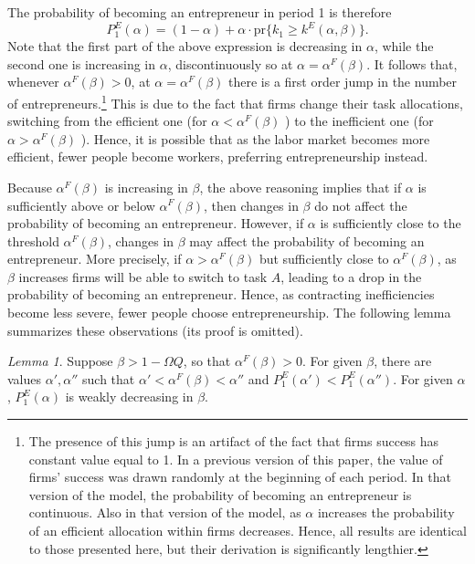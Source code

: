 \documentclass[12pt,american]{paper}
\theoremstyle{remark}
\newtheorem{lemma}{Lemma}
\begin{document}
 The probability of becoming an entrepreneur in period 1 is therefore
 \[
 P^E_1(\alpha) = (1-\alpha) + \alpha \cdot \mbox{pr}\{k_1 \geq k^E (\alpha,\beta) \}.
 \]
 Note that the first part of the above expression is decreasing in $\alpha$, while the second one is increasing in $\alpha$, discontinuously so at $\alpha=\alpha^F(\beta)$. It follows that, whenever $\alpha^F(\beta) > 0$, at $\alpha=\alpha^F(\beta)$ there is a first order jump in the number of entrepreneurs.\footnote{The presence of this jump is an artifact of the fact that firms success has constant value equal to 1. In a previous version of this paper, the value of firms' success was drawn randomly at the beginning of each period. In that version of the model, the probability of becoming an entrepreneur is continuous. Also in that version of the model, as $\alpha$ increases the probability of an efficient allocation within firms decreases. Hence, all results are identical to those presented here, but their derivation is significantly lengthier. }   This is due to the fact that firms change their task allocations, switching from the efficient one (for $\alpha<\alpha^F(\beta)$ ) to the inefficient one (for $\alpha>\alpha^F(\beta)$ ). Hence, it is possible that as the labor market becomes more efficient, fewer people become workers, preferring entrepreneurship instead. 
 
Because $\alpha^F(\beta)$ is increasing in $\beta$, the above reasoning implies that if $\alpha$ is sufficiently above or below $\alpha^F(\beta)$, then changes in $\beta$ do not affect the probability of becoming an entrepreneur. However, if $\alpha$ is sufficiently close to the threshold $\alpha^F(\beta)$, changes in $\beta$ may affect the probability of becoming an entrepreneur. More precisely, if $\alpha>\alpha^F(\beta)$ but sufficiently close to $\alpha^F(\beta)$, as $\beta$ increases firms will be able to switch to task $A$, leading to a drop in the probability of becoming an entrepreneur. Hence, as contracting inefficiencies become less severe, fewer people choose entrepreneurship. The following lemma summarizes these observations (its proof is omitted).
\begin{lemma}\label{lem: p1}
Suppose $\beta>1-\Omega Q$, so that $\alpha^F(\beta) > 0$. For given $\beta$, there are values $\alpha',\alpha''$ such that $\alpha'<\alpha^F(\beta)<\alpha''$ and $P^E_1(\alpha')<P^E_1(\alpha'')$. For given $\alpha$, $P^E_1(\alpha)$ is weakly decreasing in $\beta$.
\end{lemma}
\end{document}

